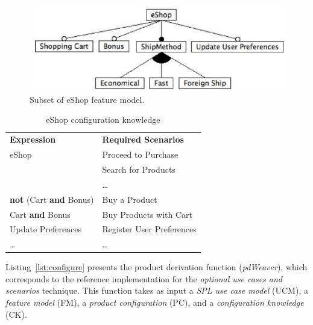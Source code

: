 \documentclass[times, 11pt,twocolumn]{article}
\begin{document}
\begin{figure}[tbh]
 \begin{center}
  \includegraphics[scale=0.40]{../images/eShop-fm-re.eps}
   \caption{Subset of eShop feature model.}
  \label{fig:eshop-fm-re}
  \end{center}
\end{figure}


\begin{table}[bth]
\begin{center}
 \caption{eShop configuration knowledge}
\label{tab:ck-running-example}
\begin{tabular}{ll}
   \hline\noalign{\smallskip}
  {\bf Expression} & {\bf Required Scenarios} \\
   \noalign{\smallskip}
   \hline
   \noalign{\smallskip}
    eShop & Proceed to Purchase \\
               & Search for Products \\
               & \ldots \\ 
    {\bf not} (Cart {\bf and} Bonus)\hspace{2pt} & Buy a Product \\ 
    Cart {\bf and} Bonus & Buy Products with Cart \\ 
    Update Preferences & Register User Preferences	 \\  
    \ldots & \ldots \\ 
  \hline
\end{tabular}
\end{center}
\end{table}

Listing~\ref{lst:configure} presents the product derivation function
(\emph{pdWeaver}), which corresponds to the reference implementation for
the \emph{optional use cases and scenarios} technique. This function takes as
input a \emph{SPL use case model} (UCM), a \emph{feature model} (FM), a \emph{product
configuration} (PC), and a \emph{configuration knowledge} (CK).
\end{document}
